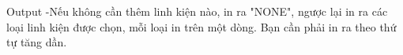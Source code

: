Output
-Nếu không cần thêm linh kiện nào, in ra "NONE", ngược lại in ra các loại linh kiện được chọn, mỗi loại in trên một dòng. Bạn cần phải in ra theo thứ tự tăng dần.